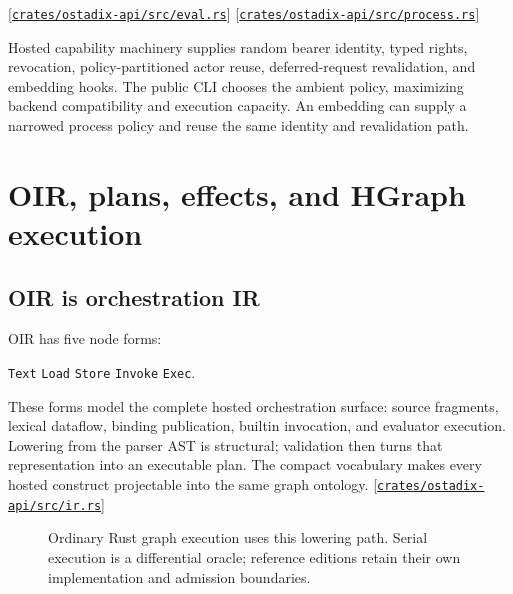 \documentclass[11pt,oneside]{article}
\newcommand{\oir}{{\mdseries\textsc{OIR}}}
\newcommand{\hgraph}{{\mdseries\textsc{HGraph}}}
\newcommand{\src}[1]{\textcolor{OSlate}{\scriptsize[\href{https://github.com/lostadi/OSTADIX/blob/c0b02c326b2329a95ba52447c7180bc93957cd57/#1}{\nolinkurl{#1}}]}\allowbreak}
\begin{document}
\src{crates/ostadix-api/src/eval.rs}
\src{crates/ostadix-api/src/process.rs}

\begin{claimbox}
Hosted capability machinery supplies random bearer identity, typed rights,
revocation, policy-partitioned actor reuse, deferred-request revalidation, and
embedding hooks. The public CLI chooses the ambient policy, maximizing
backend compatibility and execution capacity. An embedding can supply a
narrowed process policy and reuse the same identity and revalidation path.
\end{claimbox}

\section{OIR, plans, effects, and HGraph execution}
\label{sec:hgraph}

\subsection{OIR is orchestration IR}

\oir{} has five node forms:

\begin{center}
\texttt{Text}\qquad
\texttt{Load}\qquad
\texttt{Store}\qquad
\texttt{Invoke}\qquad
\texttt{Exec}.
\end{center}

These forms model the complete hosted orchestration surface: source fragments,
lexical dataflow, binding publication, builtin invocation, and evaluator
execution. Lowering from the parser AST is structural; validation then turns
that representation into an executable plan. The compact vocabulary makes
every hosted construct projectable into the same graph ontology.
\src{crates/ostadix-api/src/ir.rs}

\begin{figure}[htbp]
\centering
{}
\caption{Ordinary Rust graph execution uses this lowering path. Serial
execution is a differential oracle; reference editions retain their own
implementation and admission boundaries.}
\end{figure}
\end{document}
